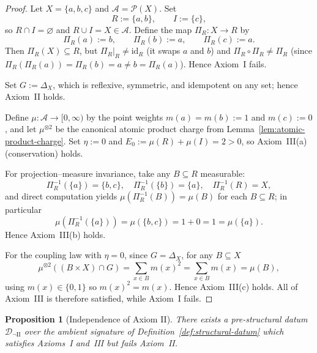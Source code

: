 \documentclass[11pt]{article}
\numberwithin{equation}{section}
\newtheorem{proposition}[theorem]{Proposition}
\theoremstyle{definition}
\begin{document}
\begin{proof}
Let $X=\{a,b,c\}$ and $\mathcal A=\mathcal P(X)$. Set
\[
R:=\{a,b\},\qquad I:=\{c\},
\]
so $R\cap I=\varnothing$ and $R\cup I=X\in\mathcal A$. Define the map $\Pi_R:X\to R$ by
\[
\Pi_R(a):=b,\qquad \Pi_R(b):=a,\qquad \Pi_R(c):=a.
\]
Then $\Pi_R(X)\subseteq R$, but $\Pi_R|_R\ne\mathrm{id}_R$ (it swaps $a$ and $b$) and $\Pi_R\circ\Pi_R\ne\Pi_R$ (since $\Pi_R(\Pi_R(a))=\Pi_R(b)=a\ne b=\Pi_R(a)$). Hence Axiom~I fails.

Set $G:=\Delta_X$, which is reflexive, symmetric, and idempotent on any set; hence Axiom~II holds.

Define $\mu:\mathcal A\to[0,\infty)$ by the point weights $m(a)=m(b):=1$ and $m(c):=0$, and let $\mu^{\otimes2}$ be the canonical atomic product charge from Lemma~\ref{lem:atomic-product-charge}. Set $\eta:=0$ and $E_0:=\mu(R)+\mu(I)=2>0$, so Axiom~III(a) (conservation) holds.

For projection--measure invariance, take any $B\subseteq R$ measurable:
\[
\Pi_R^{-1}(\{a\})=\{b,c\},\quad \Pi_R^{-1}(\{b\})=\{a\},\quad \Pi_R^{-1}(R)=X,
\]
and direct computation yields $\mu(\Pi_R^{-1}(B))=\mu(B)$ for each $B\subseteq R$; in particular
\[
\mu(\Pi_R^{-1}(\{a\}))=\mu(\{b,c\})=1+0=1=\mu(\{a\}).
\]
Hence Axiom~III(b) holds.

For the coupling law with $\eta=0$, since $G=\Delta_X$, for any $B\subseteq X$
\[
\mu^{\otimes2}((B\times X)\cap G)=\sum_{x\in B} m(x)^2=\sum_{x\in B} m(x)=\mu(B),
\]
using $m(x)\in\{0,1\}$ so $m(x)^2=m(x)$. Hence Axiom~III(c) holds. All of Axiom~III is therefore satisfied, while Axiom~I fails.
\end{proof}

\begin{proposition}[Independence of Axiom II]\label{prop:indep-II}
There exists a pre-structural datum $\mathcal D_{\neg \mathrm{II}}$ over the ambient signature of Definition~\ref{def:structural-datum} which satisfies Axioms~I and~III but fails Axiom~II.
\end{proposition}
\end{document}
